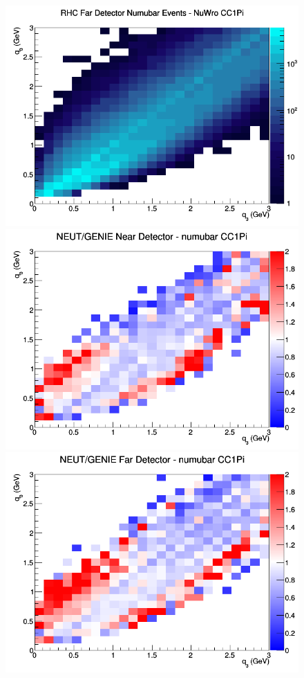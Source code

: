 \documentclass[12pt]{article}
\begin{document}
\begin{figure}[h]
\endminipage
{}
\includegraphics[width=\linewidth]{eff_q0_q3/GAr/CC1Pi_RHC_FD_numubar_q3_q0_NuWro.png}
\endminipage
\newline
{}
\includegraphics[width=\linewidth]{eff_q0_q3/GAr/ratios/CC1Pi_NEUT_GENIE_numubar_near_q3_q0.png}
\endminipage
{}
\includegraphics[width=\linewidth]{eff_q0_q3/GAr/ratios/CC1Pi_NEUT_GENIE_numubar_far_q3_q0.png}

\end{figure}
\end{document}
